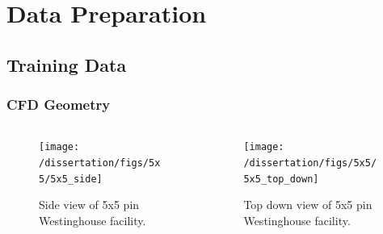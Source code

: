 \documentclass[t, pdftex]{beamer}
\begin{document}
\section[Preprocessing]{Data Preparation}
\subsection*{Training Data}
\begin{frame}
\frametitle{CFD Geometry}
\begin{columns}
    \begin{column}{0.5\textwidth}
\begin{figure}[H]
    \centering
    \texttt{[image: /dissertation/figs/5x5/5x5\_side]}
    \caption{\centering Side view of 5x5 pin \\ Westinghouse facility.}
    \label{fig:5x5side}
\end{figure}
    \end{column}
\begin{column}{0.5\textwidth}
\begin{figure}[H]
    \centering
    \texttt{[image: /dissertation/figs/5x5/5x5\_top\_down]}
    \caption{\centering Top down view of 5x5 pin \\ Westinghouse facility.}
    \label{fig:5x5topdown}
\end{figure}
\end{column}
\end{columns}
\end{frame}

\end{document}
